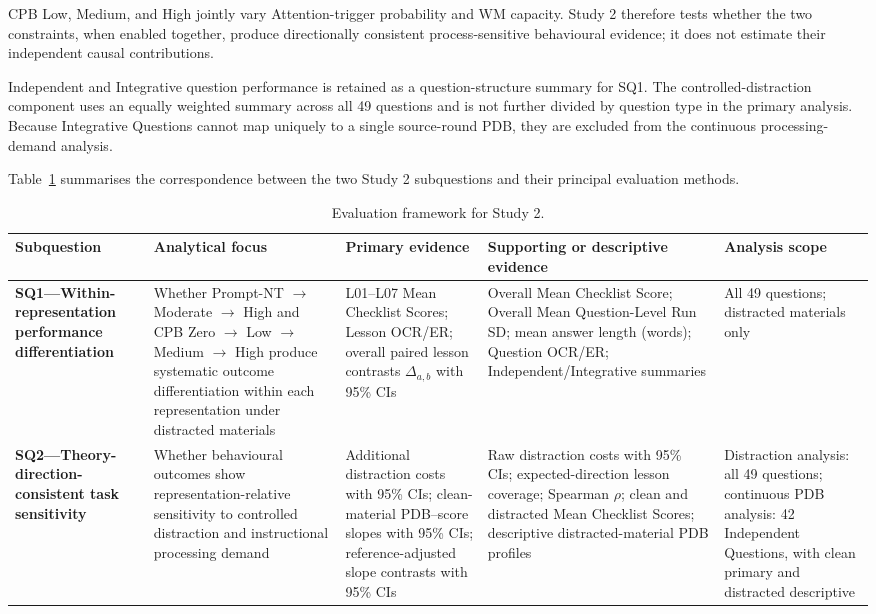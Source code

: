 CPB Low, Medium, and High jointly vary Attention-trigger probability and WM capacity. Study 2 therefore tests whether the two constraints, when enabled together, produce directionally consistent process-sensitive behavioural evidence; it does not estimate their independent causal contributions.

Independent and Integrative question performance is retained as a question-structure summary for SQ1. The controlled-distraction component uses an equally weighted summary across all 49 questions and is not further divided by question type in the primary analysis. Because Integrative Questions cannot map uniquely to a single source-round PDB, they are excluded from the continuous processing-demand analysis.

Table~\ref{tab:study2-evaluation-framework} summarises the correspondence between the two Study 2 subquestions and their principal evaluation methods.

\begin{table}[H]
\centering
\caption{Evaluation framework for Study 2.}
\label{tab:study2-evaluation-framework}
\scriptsize
\setlength{\tabcolsep}{3pt}
\renewcommand{\arraystretch}{1.2}
\begin{tabularx}{\textwidth}{>{\raggedright\arraybackslash}p{}>{\raggedright\arraybackslash}p{}>{\raggedright\arraybackslash}X>{\raggedright\arraybackslash}p{}>{\raggedright\arraybackslash}p{}}
\toprule
\textbf{Subquestion} & \textbf{Analytical focus} & \textbf{Primary evidence} & \textbf{Supporting or descriptive evidence} & \textbf{Analysis scope} \\
\midrule
\textbf{SQ1---Within-representation performance differentiation} & Whether Prompt-NT $\rightarrow$ Moderate $\rightarrow$ High and CPB Zero $\rightarrow$ Low $\rightarrow$ Medium $\rightarrow$ High produce systematic outcome differentiation within each representation under distracted materials & L01--L07 Mean Checklist Scores; Lesson OCR/ER; overall paired lesson contrasts $\Delta_{a,b}$ with 95\% CIs & Overall Mean Checklist Score; Overall Mean Question-Level Run SD; mean answer length (words); Question OCR/ER; Independent/Integrative summaries & All 49 questions; distracted materials only \\
\textbf{SQ2---Theory-direction-consistent task sensitivity} & Whether behavioural outcomes show representation-relative sensitivity to controlled distraction and instructional processing demand & Additional distraction costs with 95\% CIs; clean-material PDB--score slopes with 95\% CIs; reference-adjusted slope contrasts with 95\% CIs & Raw distraction costs with 95\% CIs; expected-direction lesson coverage; Spearman $\rho$; clean and distracted Mean Checklist Scores; descriptive distracted-material PDB profiles & Distraction analysis: all 49 questions; continuous PDB analysis: 42 Independent Questions, with clean primary and distracted descriptive \\
\bottomrule
\end{tabularx}
\end{table}


